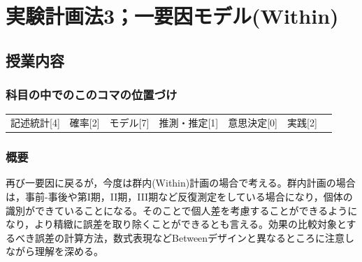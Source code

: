 \section{実験計画法3；一要因モデル(Within)}
\label{D1_lesson14}

\subsection{授業内容}
\subsubsection{科目の中でのこのコマの位置づけ}
\begin{tabular}[t]{ccccccc}
    記述統計[4] & 確率[2] & モデル[7] & 推測・推定[1] & 意思決定[0] & 実践[2]
\end{tabular}
\subsubsection{概要}
再び一要因に戻るが，今度は群内(Within)計画の場合で考える。群内計画の場合は，事前-事後や第I期，II期，III期など反復測定をしている場合になり，個体の識別ができていることになる。そのことで個人差を考慮することができるようになり，より精緻に誤差を取り除くことができるとも言える。効果の比較対象とするべき誤差の計算方法，数式表現などBetweenデザインと異なるところに注意しながら理解を深める。
